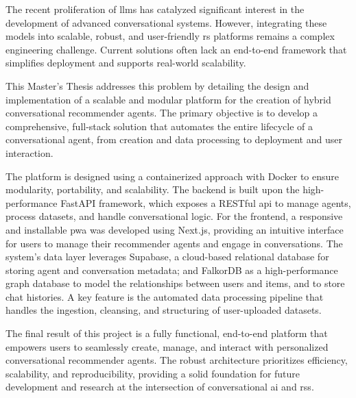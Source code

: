 
The recent proliferation of \acp{llm} has catalyzed significant interest in the development of advanced conversational systems. However, integrating these models into scalable, robust, and user-friendly \acl{rs} platforms remains a complex engineering challenge. Current solutions often lack an end-to-end framework that simplifies deployment and supports real-world scalability.

This Master's Thesis addresses this problem by detailing the design and implementation of a scalable and modular platform for the creation of hybrid conversational recommender agents. The primary objective is to develop a comprehensive, full-stack solution that automates the entire lifecycle of a conversational agent, from creation and data processing to deployment and user interaction.

The platform is designed using a containerized approach with Docker to ensure modularity, portability, and scalability. The backend is built upon the high-performance FastAPI framework, which exposes a RESTful \ac{api} to manage agents, process datasets, and handle conversational logic. For the frontend, a responsive and installable \ac{pwa} was developed using Next.js, providing an intuitive interface for users to manage their recommender agents and engage in conversations. The system's data layer leverages Supabase, a cloud-based relational database for storing agent and conversation metadata; and FalkorDB as a high-performance graph database to model the relationships between users and items, and to store chat histories. A key feature is the automated data processing pipeline that handles the ingestion, cleansing, and structuring of user-uploaded datasets.

The final result of this project is a fully functional, end-to-end platform that empowers users to seamlessly create, manage, and interact with personalized conversational recommender agents. The robust architecture prioritizes efficiency, scalability, and reproducibility, providing a solid foundation for future development and research at the intersection of conversational \acs{ai} and \aclp{rs}.

